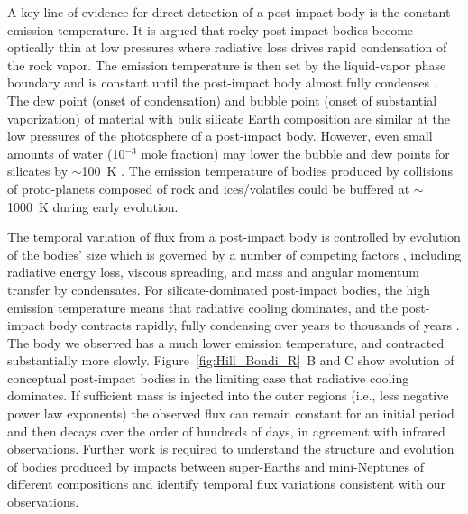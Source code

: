 \documentclass[sn-nature]{sn-jnl}%
\begin{document}

A key line of evidence for direct detection of a post-impact body is the constant emission temperature.
%
It is argued \cite{Lock18} that rocky post-impact bodies become optically thin at low pressures where radiative loss drives rapid condensation of the rock vapor.
%
The emission temperature is then set by the liquid-vapor phase boundary and is constant until the post-impact body almost fully condenses \cite{Lock18,Caracas2023}.
%
The dew point (onset of condensation) and bubble point (onset of substantial vaporization) of material with bulk silicate Earth composition are similar \cite[$\sim2300$~K, within $\sim 100$~K;][]{Lock18,Fegley2023_BSE_cond} at the low pressures of the photosphere of a post-impact body.
%
However, even small amounts of water (10$^{-3}$ mole fraction) may lower the bubble and dew points for silicates by $\sim$100~K \cite[][]{Fegley2023_BSE_cond,Lock18}. 
%
The emission temperature of bodies produced by collisions of proto-planets composed of rock and ices/volatiles could be buffered at $\sim$1000~K during early evolution.



The temporal variation of flux from a post-impact body is controlled by evolution of the bodies' size which is governed by a number of competing factors \cite{Lock2018moon,Lock2020}, including radiative energy loss, viscous spreading, and mass and angular momentum transfer by condensates.
%
For silicate-dominated post-impact bodies, the high emission temperature means that radiative cooling dominates, and the post-impact body contracts rapidly, fully condensing over years to thousands of years \cite{Lock2018moon,Lock2020}.
%
The body we observed has a much lower emission temperature, and contracted substantially more slowly.
%
Figure~\ref{fig:Hill_Bondi_R}~B and C show evolution of conceptual post-impact bodies in the limiting case that radiative cooling dominates.
%
If sufficient mass is injected into the outer regions (i.e., less negative power law exponents) the observed flux can remain constant for an initial period and then decays over the order of hundreds of days, in agreement with infrared observations.
%
Further work is required to understand the structure and evolution of bodies produced by impacts between super-Earths and mini-Neptunes of different compositions and identify temporal flux variations consistent with our observations.
\end{document}
